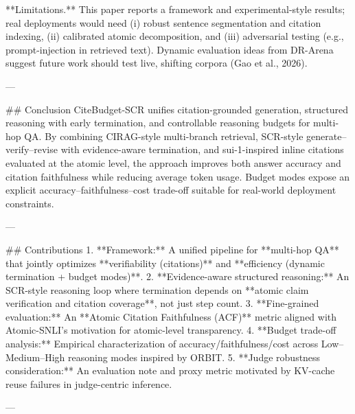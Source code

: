 **Limitations.** This paper reports a framework and experimental-style results; real deployments would need (i) robust sentence segmentation and citation indexing, (ii) calibrated atomic decomposition, and (iii) adversarial testing (e.g., prompt-injection in retrieved text). Dynamic evaluation ideas from DR-Arena suggest future work should test live, shifting corpora (Gao et al., 2026).

---

## Conclusion  
CiteBudget-SCR unifies citation-grounded generation, structured reasoning with early termination, and controllable reasoning budgets for multi-hop QA. By combining CIRAG-style multi-branch retrieval, SCR-style generate–verify–revise with evidence-aware termination, and sui-1-inspired inline citations evaluated at the atomic level, the approach improves both answer accuracy and citation faithfulness while reducing average token usage. Budget modes expose an explicit accuracy–faithfulness–cost trade-off suitable for real-world deployment constraints.

---

## Contributions  
1. **Framework:** A unified pipeline for **multi-hop QA** that jointly optimizes **verifiability (citations)** and **efficiency (dynamic termination + budget modes)**.  
2. **Evidence-aware structured reasoning:** An SCR-style reasoning loop where termination depends on **atomic claim verification and citation coverage**, not just step count.  
3. **Fine-grained evaluation:** An **Atomic Citation Faithfulness (ACF)** metric aligned with Atomic-SNLI’s motivation for atomic-level transparency.  
4. **Budget trade-off analysis:** Empirical characterization of accuracy/faithfulness/cost across Low–Medium–High reasoning modes inspired by ORBIT.  
5. **Judge robustness consideration:** An evaluation note and proxy metric motivated by KV-cache reuse failures in judge-centric inference.

---